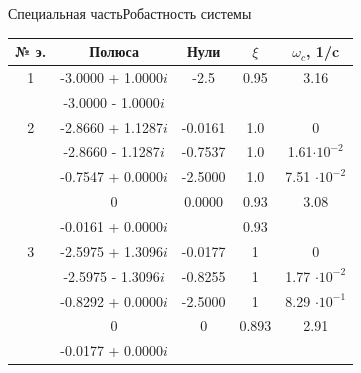 \begin{frame}{Специальная часть}{Робастность системы}
\begin{table}[H]
    \begin{tabular}{|c|c|c|c|c|}
        \hline 
        № э.&Полюса & Нули & $\xi$ & $\omega_c$, 1/c \\ \hline 
        1& -3.0000 + 1.0000$i$ & -2.5 & 0.95 & 3.16\\ 
        & -3.0000 - 1.0000$i$ &   &  &  \\ \hline
        2& -2.8660 + 1.1287$i$ & -0.0161  & 1.0 &  0\\ 
        & -2.8660 - 1.1287$i$ &  -0.7537 &1.0 & 1.61$\cdot 10^{-2}$\\ 
        & -0.7547 + 0.0000$i$ &  -2.5000 & 1.0 & 7.51 $\cdot 10^{-2}$\\ 
        & 0 & 0.0000 & 0.93& 3.08 \\ 
        & -0.0161 + 0.0000$i$ &  & 0.93 &  \\ \hline 
        3& -2.5975 + 1.3096$i$ & -0.0177 & 1 & 0\\ 
        & -2.5975 - 1.3096$i$ & -0.8255 & 1& 1.77 $\cdot 10^{-2}$ \\ 
        & -0.8292 + 0.0000$i$ & -2.5000 & 1 & 8.29 $\cdot 10^{-1}$\\ 
        & 0 & 0 & 0.893 & 2.91 \\ 
        & -0.0177 + 0.0000$i$ &  &  &  \\ \hline 
    \end{tabular}
\end{table}
\end{frame}

